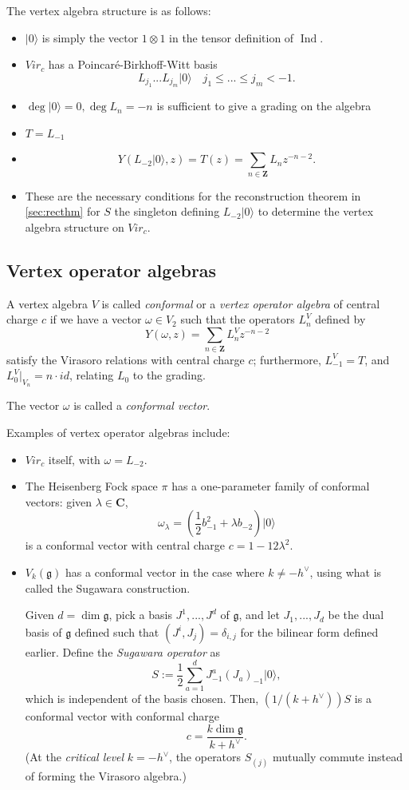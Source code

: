 \documentclass{article}
\newcommand{\CC}{\mathbold{C}}
\newcommand{\ZZ}{\mathbold{Z}}
\newcommand{\vac}{|0\rangle}
\newcommand{\gf}{\mathfrak{g}}
\DeclareMathOperator{\Ind}{Ind}
\begin{document}
The vertex algebra structure is as follows:
\begin{itemize}
\item $\vac$ is simply the vector $1 \otimes 1$ in the tensor definition of $\Ind$.
\item $Vir_c$ has a Poincaré-Birkhoff-Witt basis
\[L_{j_1}...L_{j_m}\vac \quad j_1\le ... \le j_m < -1. \]
\item $\deg \vac=0, \deg L_n=-n$ is sufficient to give a grading on the algebra
\item $T=L_{-1}$
\item \[Y(L_{-2}\vac,z)=T(z)=\sum_{n \in \ZZ}L_nz^{-n-2}. \]
\item These are the necessary conditions for the reconstruction theorem in \ref{sec:recthm} for $S$ the singleton defining $L_{-2}\vac$ to determine the vertex algebra structure on $Vir_c$.
\end{itemize}

\subsection{Vertex operator algebras}
A vertex algebra $V$ is called \textit{conformal} or a \textit{vertex operator algebra} of central charge $c$ if we have a vector $\omega \in V_2$ such that the operators $L^V_n$ defined by
\[Y(\omega,z)=\sum_{n \in \ZZ}L^V_n z^{-n-2} \]
satisfy the Virasoro relations with central charge $c$; furthermore, $L^V_{-1}=T$, and $L^V_{0}|_{V_n}=n\cdot id$, relating $L_0$ to the grading.

The vector $\omega$ is called a \textit{conformal vector}.

Examples of vertex operator algebras include:
\begin{itemize}
\item $Vir_c$ itself, with $\omega=L_{-2}$.
\item The Heisenberg Fock space $\pi$ has a one-parameter family of conformal vectors: given $\lambda \in \CC$,
\[\omega_\lambda=\left(\frac{1}{2}b_{-1}^2+\lambda b_{-2}\right)\vac \]
is a conformal vector with central charge $c=1-12\lambda^2$.
\item $V_k(\gf)$ has a conformal vector in the case where $k \ne -h^\vee$, using what is called the Sugawara construction.

Given $d=\dim \gf$, pick a basis $J^1,...,J^d$ of $\gf$, and let $J_1,...,J_d$ be the dual basis of $\gf$ defined such that $(J^i,J_j)=\delta_{i,j}$ for the bilinear form defined earlier.  Define the \textit{Sugawara operator} as
\[S:=\frac{1}{2} \sum_{a=1}^d J^a_{-1}(J_a)_{-1} \vac, \]
which is independent of the basis chosen.  Then, $(1/(k+h^\vee))S$ is a conformal vector with conformal charge
\[c=\frac{k \dim \gf}{k+h^\vee}. \]
(At the \textit{critical level} $k=-h^\vee$, the operators $S_{(j)}$ mutually commute instead of forming the Virasoro algebra.)
\end{itemize}
\end{document}
